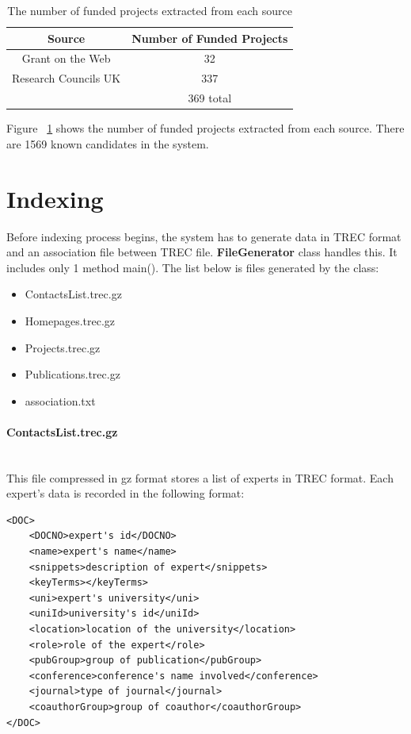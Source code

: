 \begin{table}
\centering
\begin{tabular}{|c|c|}
\hline \textbf{Source} & \textbf{Number of Funded Projects} \\
\hline Grant on the Web & 32 \\
\hline Research Councils UK & 337 \\
\hline   & 369 total \\ 
\hline
\end{tabular}
\caption{The number of funded projects extracted from each source} \label{table:stats}
\end{table}
Figure ~\ref{table:stats} shows the number of funded projects extracted from each source. There are 1569 known candidates in the system.

\section{Indexing}

Before indexing process begins, the system has to generate data in TREC format and an association file between TREC file. \textbf{FileGenerator} class
handles this. It includes only 1 method main(). The list below is files generated by the class:
\begin{itemize}
 \item ContactsList.trec.gz
 \item Homepages.trec.gz
 \item Projects.trec.gz
 \item Publications.trec.gz
 \item association.txt
\end{itemize}

\paragraph{ContactsList.trec.gz} \hspace{0pt} \\
This file compressed in gz format stores a list of experts in TREC format. Each expert's data is recorded in the following format:
\begin{verbatim}
<DOC>
	<DOCNO>expert's id</DOCNO>
	<name>expert's name</name>
	<snippets>description of expert</snippets>
	<keyTerms></keyTerms>
	<uni>expert's university</uni>
	<uniId>university's id</uniId>
	<location>location of the university</location>
	<role>role of the expert</role>
	<pubGroup>group of publication</pubGroup>
	<conference>conference's name involved</conference>
	<journal>type of journal</journal>
	<coauthorGroup>group of coauthor</coauthorGroup>
</DOC>
\end{verbatim}


